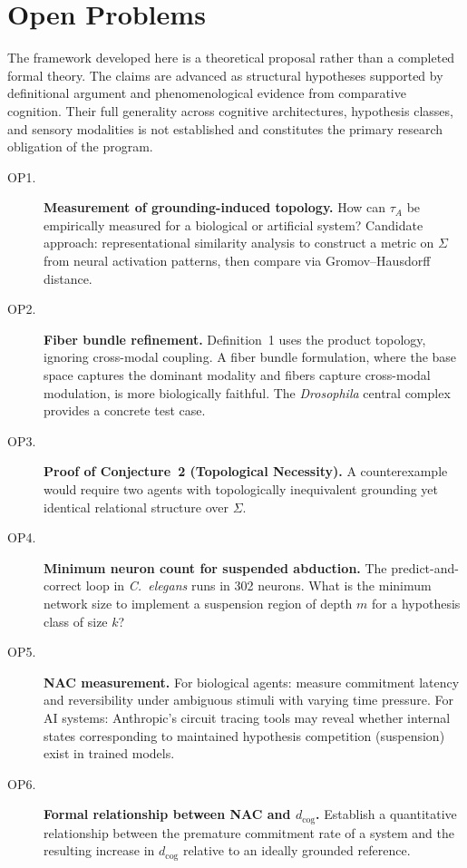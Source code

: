 \documentclass[12pt]{article}
\begin{document}
\section{Open Problems}

The framework developed here is a theoretical proposal rather than a
completed formal theory.
The claims are advanced as structural hypotheses supported by
definitional argument and phenomenological evidence from comparative
cognition.
Their full generality across cognitive architectures, hypothesis
classes, and sensory modalities is not established and constitutes
the primary research obligation of the program.

\begin{description}
  \item[OP1.] \textbf{Measurement of grounding-induced topology.}
    How can $\tau_A$ be empirically measured for a biological or
    artificial system?
    Candidate approach: representational similarity analysis
    \cite{kriegeskorte2008} to construct a metric on $\Sigma$ from
    neural activation patterns, then compare via Gromov--Hausdorff
    distance.

  \item[OP2.] \textbf{Fiber bundle refinement.}
    Definition~1 uses the product topology, ignoring cross-modal
    coupling. A fiber bundle formulation, where the base space captures
    the dominant modality and fibers capture cross-modal modulation,
    is more biologically faithful. The \textit{Drosophila} central
    complex \cite{scheffer2020} provides a concrete test case.

  \item[OP3.] \textbf{Proof of Conjecture~2 (Topological Necessity).}
    A counterexample would require two agents with topologically
    inequivalent grounding yet identical relational structure over
    $\Sigma$.

  \item[OP4.] \textbf{Minimum neuron count for suspended abduction.}
    The predict-and-correct loop in \textit{C.~elegans} runs in 302
    neurons. What is the minimum network size to implement a suspension
    region of depth $m$ for a hypothesis class of size $k$?

  \item[OP5.] \textbf{NAC measurement.}
    For biological agents: measure commitment latency and reversibility
    under ambiguous stimuli with varying time pressure.
    For AI systems: Anthropic's circuit tracing tools
    \cite{anthropic2025circuit} may reveal whether internal states
    corresponding to maintained hypothesis competition (suspension)
    exist in trained models.

  \item[OP6.] \textbf{Formal relationship between NAC and
    $d_\mathrm{cog}$.}
    Establish a quantitative relationship between the premature
    commitment rate of a system and the resulting increase in
    $d_\mathrm{cog}$ relative to an ideally grounded reference.
\end{description}
\end{document}
